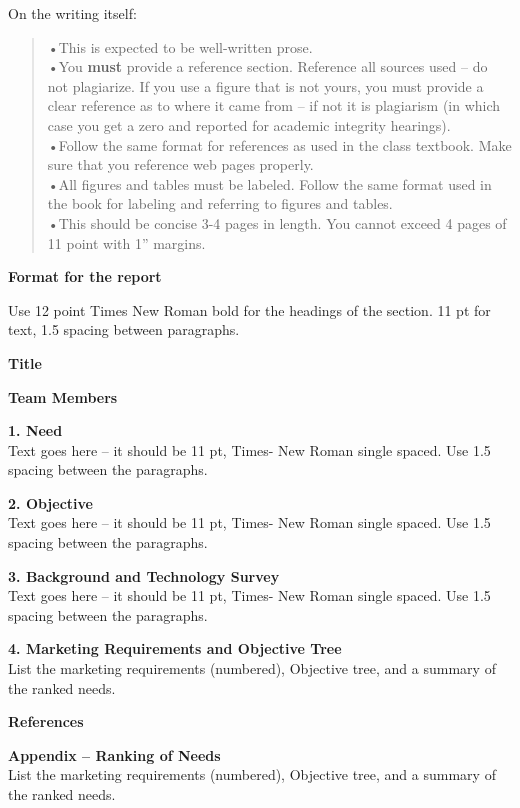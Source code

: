 \begin{enumerate}
\begin{onlysolution}
On the writing itself:
\begin{quote}
•This is expected to be well-written prose.\\
•You \textbf{must} provide a reference section. Reference all sources
used -- do not plagiarize. If you use a figure that is not yours, you
must provide a clear reference as to where it came from -- if not it is
plagiarism (in which case you get a zero and reported for academic
integrity hearings).\\
•Follow the same format for references as used in the class textbook.
Make sure that you reference web pages properly.\\
•All figures and tables must be labeled. Follow the same format used in
the book for labeling and referring to figures and tables.\\
•This should be concise 3-4 pages in length. You cannot exceed 4 pages
of 11 point with 1'' margins.\\
\end{quote}

\begin{center}
\textbf{Format for the report}
\end{center}

Use 12 point Times New Roman bold for the headings of the section. 11 pt
for text, 1.5 spacing between paragraphs.

\textbf{Title}

\textbf{Team Members}

\textbf{1. Need}\\
Text goes here -- it should be 11 pt, Times- New Roman single spaced.
Use 1.5 spacing between the paragraphs.

\textbf{2. Objective}\\
Text goes here -- it should be 11 pt, Times- New Roman single spaced.
Use 1.5 spacing between the paragraphs.

\textbf{3. Background and Technology Survey}\\
Text goes here -- it should be 11 pt, Times- New Roman single spaced.
Use 1.5 spacing between the paragraphs.

\textbf{4. Marketing Requirements and Objective Tree}\\
List the marketing requirements (numbered), Objective tree, and a
summary of the ranked needs.

\textbf{References}

\textbf{Appendix -- Ranking of Needs}\\
List the marketing requirements (numbered), Objective tree, and a
summary of the ranked needs.
  \end{onlysolution}
\end{enumerate}
